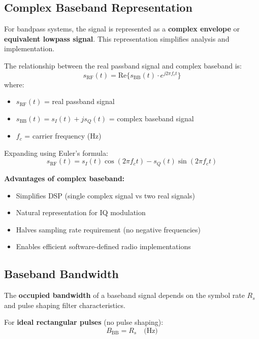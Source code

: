 \subsection{Complex Baseband Representation}

For bandpass systems, the signal is represented as a \textbf{complex envelope} or \textbf{equivalent lowpass signal}. This representation simplifies analysis and implementation.

The relationship between the real passband signal and complex baseband is:
\begin{equation}
s_{\text{RF}}(t) = \text{Re}\{s_{\text{BB}}(t) \cdot e^{j2\pi f_c t}\}
\end{equation}
where:
\begin{itemize}
\item $s_{\text{RF}}(t)$ = real passband signal
\item $s_{\text{BB}}(t) = s_I(t) + js_Q(t)$ = complex baseband signal
\item $f_c$ = carrier frequency (Hz)
\end{itemize}

Expanding using Euler's formula:
\begin{equation}
s_{\text{RF}}(t) = s_I(t)\cos(2\pi f_c t) - s_Q(t)\sin(2\pi f_c t)
\end{equation}

\textbf{Advantages of complex baseband:}
\begin{itemize}
\item Simplifies DSP (single complex signal vs two real signals)
\item Natural representation for IQ modulation
\item Halves sampling rate requirement (no negative frequencies)
\item Enables efficient software-defined radio implementations
\end{itemize}

\subsection{Baseband Bandwidth}

The \textbf{occupied bandwidth} of a baseband signal depends on the symbol rate $R_s$ and pulse shaping filter characteristics.

For \textbf{ideal rectangular pulses} (no pulse shaping):
\begin{equation}
B_{\text{BB}} = R_s \quad \text{(Hz)}
\end{equation}

